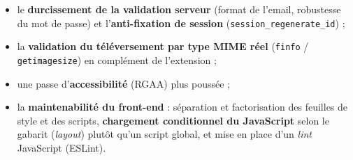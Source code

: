 \begin{itemize}
  \item le \textbf{durcissement de la validation serveur} (format de l'email, robustesse du mot de
        passe) et l'\textbf{anti-fixation de session} (\texttt{session\_regenerate\_id}) ;
  \item la \textbf{validation du téléversement par type MIME réel} (\texttt{finfo} /
        \texttt{getimagesize}) en complément de l'extension ;
  \item une passe d'\textbf{accessibilité} (RGAA) plus poussée ;
  \item la \textbf{maintenabilité du front-end} : séparation et factorisation des feuilles de
        style et des scripts, \textbf{chargement conditionnel du JavaScript} selon le gabarit
        (\emph{layout}) plutôt qu'un script global, et mise en place d'un \emph{lint} JavaScript
        (ESLint).
\end{itemize}

